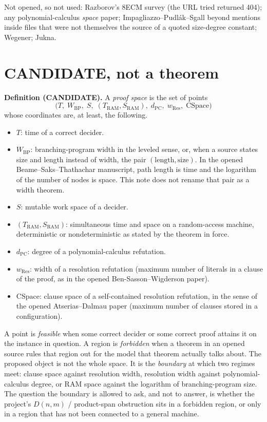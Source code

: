 \documentclass[11pt]{article}
\begin{document}
Not opened, so not used: Razborov's 8ECM survey (the URL tried returned 404); any polynomial-calculus \emph{space} paper; Impagliazzo--Pudl\'ak--Sgall beyond mentions inside files that were not themselves the source of a quoted size-degree constant; Wegener; Jukna.

\section*{CANDIDATE, not a theorem}
\textbf{Definition (CANDIDATE).}
A \emph{proof space} is the set of points
\[
\bigl(T,\; W_{\mathrm{BP}},\; S,\; (T_{\mathrm{RAM}},S_{\mathrm{RAM}}),\; d_{\mathrm{PC}},\; w_{\mathrm{Res}},\; \mathrm{CSpace}\bigr)
\]
whose coordinates are, at least, the following.
\begin{itemize}
\item \(T\): time of a correct decider.
\item \(W_{\mathrm{BP}}\): branching-program width in the leveled sense, or, when a source states size and length instead of width, the pair \((\mathrm{length},\mathrm{size})\). In the opened Beame--Saks--Thathachar manuscript, path length is time and the logarithm of the number of nodes is space. This note does not rename that pair as a width theorem.
\item \(S\): mutable work space of a decider.
\item \((T_{\mathrm{RAM}},S_{\mathrm{RAM}})\): simultaneous time and space on a random-access machine, deterministic or nondeterministic as stated by the theorem in force.
\item \(d_{\mathrm{PC}}\): degree of a polynomial-calculus refutation.
\item \(w_{\mathrm{Res}}\): width of a resolution refutation (maximum number of literals in a clause of the proof, as in the opened Ben-Sasson--Wigderson paper).
\item \(\mathrm{CSpace}\): clause space of a self-contained resolution refutation, in the sense of the opened Atserias--Dalmau paper (maximum number of clauses stored in a configuration).
\end{itemize}
A point is \emph{feasible} when some correct decider or some correct proof attains it on the instance in question. A region is \emph{forbidden} when a theorem in an opened source rules that region out for the model that theorem actually talks about. The proposed object is not the whole space. It is the \emph{boundary} at which two regimes meet: clause space against resolution width, resolution width against polynomial-calculus degree, or RAM space against the logarithm of branching-program size. The question the boundary is allowed to ask, and not to answer, is whether the project's \(D(n,m)\) / product-span obstruction sits in a forbidden region, or only in a region that has not been connected to a general machine.
\end{document}
